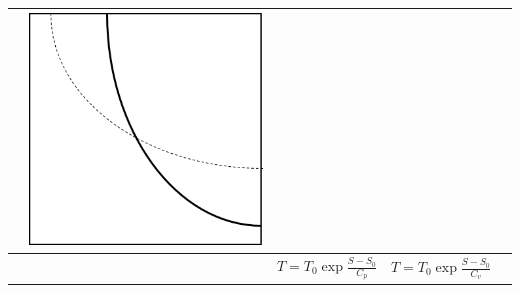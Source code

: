 \documentclass[11pt]{article}
\begin{document}
\begin{table}[!h]
\begin{center}
\begin{tabular}{|r|c|c|c|c|}
     & \includegraphics[scale=0.25]{isentropiquepv.png}\\
     
     
     \hline
     
     &
  & $T = T_0 \exp{\frac{S-S_0}{C_p}}$
  & $T = T_0 \exp{\frac{S-S_0}{C_v}}$
  &
  \\
     

\end{tabular}
\end{center}
\end{table}
\end{document}
